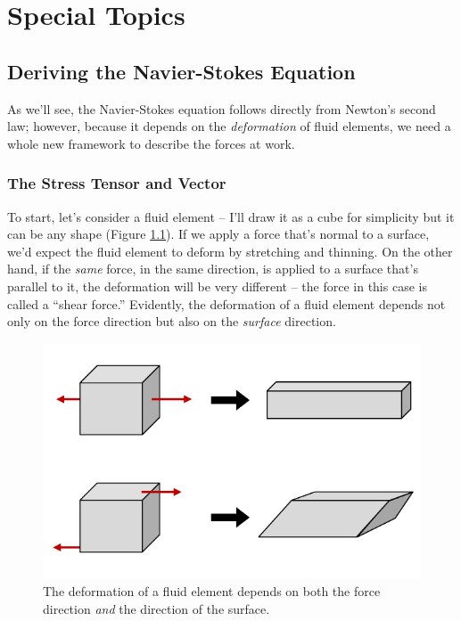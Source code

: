 \chapter{Special Topics}

%
%

\section{Deriving the Navier-Stokes Equation}
\label{sec_ns_deriv}

As we'll see, the Navier-Stokes equation follows directly from Newton's second law; however, because it depends on the \emph{deformation} of fluid elements, we need a whole new framework to describe the forces at work. 

\subsection{The Stress Tensor and Vector}

To start, let's consider a fluid element -- I'll draw it as a cube for simplicity but it can be any shape (Figure \ref{fig_deform}).  If we apply a force that's normal to a surface, we'd expect the fluid element to deform by stretching and thinning.  On the other hand, if the \emph{same} force, in the same direction, is applied to a surface that's parallel to it, the deformation will be very different -- the force in this case is called a ``shear force.''  Evidently, the deformation of a fluid element depends not only on the force direction but also on the \emph{surface} direction. 

\begin{figure}
\centering
\includegraphics[width=0.9\linewidth]{Figures/Chapter2/fig_deform}
\caption{The deformation of a fluid element depends on both the force direction \emph{and} the direction of the surface. }
\label{fig_deform}
\end{figure}

